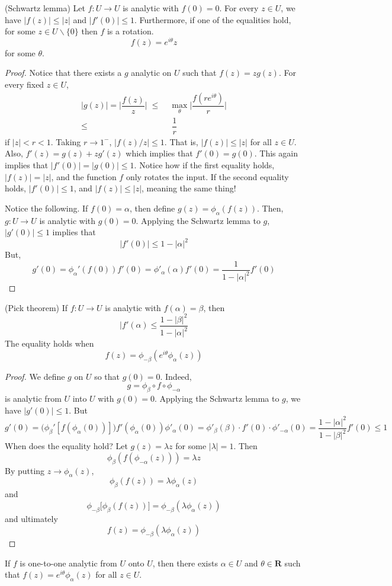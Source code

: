 \vspace{2ex}
\begin{thm}
(Schwartz lemma) Let $f:U\rightarrow U$ is analytic with $f(0)=0$. For every $z\in U$, we have $|f(z)|\leq |z|$ and $|f'(0)|\leq 1$. Furthermore, if one of the equalities hold, for some $z\in U \backslash \{0\}$ then $f$ is a rotation.
\[f(z)=e^{i\theta }z\]
for some $\theta $.
\end{thm}
\vspace{2ex}
\begin{proof}
Notice that there exists a $g$ analytic on $U$ such that $f(z)=zg(z)$. For every fixed $z\in U$,
\[\begin{align*}
|g(z)|=\Big|\dfrac{f(z)}{z}\Big|\;\leq\; &\max_{\theta }\Big|\dfrac{f(re^{i\theta })}{r}\Big|\\
\leq \;&\; \dfrac{1}{r}
\end{align*}\]
if $|z|<r<1$. Taking $r\rightarrow 1^{-}$, $|f(z)/z|\leq 1$. That is, $|f(z)|\leq |z|$ for all $z\in U$. Also, $f'(z)=g(z)+zg'(z)$ which implies that $f'(0)=g(0)$. This again implies that $|f'(0)|=|g(0)|\leq 1$. Notice how if the first equality holds, $|f(z)|=|z|$, and the function $f$ only rotates the input. If the second equality holds, $|f'(0)|\leq 1$, and $|f(z)|\leq |z|$, meaning the same thing!

\bigskip

Notice the following. If $f(0)=\alpha $, then define $g(z)=\phi _{\alpha }(f(z))$. Then, $g:U\rightarrow U$ is analytic with $g(0)=0$. Applying the Schwartz lemma to $g$, $|g'(0)|\leq 1$ implies that
\[|f'(0)|\leq 1-|\alpha |^2\]
But, 
\[g'(0)=\phi _{\alpha }'(f(0))f'(0)=\phi '_{\alpha }(\alpha )f'(0)=\dfrac{1}{1-|\alpha |^2}f'(0)\]

\end{proof}
\vspace{2ex}
\begin{thm}
(Pick theorem) If $f:U\rightarrow U$ is analytic with $f(\alpha )=\beta $, then
\[|f'(\alpha )\leq \dfrac{1-|\beta |^2}{1-|\alpha |^2}\]
The equality holds when 
\[f(z)=\phi _{-\beta }(e^{i\theta }\phi _{\alpha }(z))\]
\end{thm}
\vspace{2ex}
\begin{proof}
We define $g$ on $U$ so that $g(0)=0$. Indeed,
\[g=\phi _{\beta }\circ f\circ \phi _{-\alpha }\]
is analytic from $U$ into $U$ with $g(0)=0$. Applying the Schwartz lemma to $g$, we have $|g'(0)|\leq 1$. But 
\[g'(0)=\Big(\phi _{\beta }'[f(\phi _{\alpha }(0))]\Big)f'(\phi _{\alpha }(0))\phi '_{\alpha }(0)=\phi '_{\beta }(\beta )\cdot f'(0 )\cdot \phi '_{-\alpha }(0)=\dfrac{1-|\alpha |^2}{1-|\beta |^2}f'(0)\leq 1\]
When does the equality hold? Let $g(z)=\lambda z$ for some $|\lambda |=1$. Then
\[\phi _{\beta }(f(\phi _{-\alpha }(z)))=\lambda z\]
By putting $z\rightarrow \phi _{\alpha }(z)$, 
\[\phi _{\beta }(f(z))=\lambda \phi _{\alpha }(z)\]
and
\[\phi _{-\beta }\Big[\phi _{\beta }(f(z))\Big]=\phi _{-\beta }(\lambda \phi _{\alpha }(z))\]
and ultimately
\[f(z)=\phi _{-\beta }(\lambda \phi _{\alpha}(z))\]

\end{proof}
\vspace{2ex}
\begin{thm}
If $f$ is one-to-one analytic from $U$ onto $U$, then there exists $\alpha \in U$ and $\theta \in {\bm R}$ such that $f(z)=e^{i\theta }\phi _{\alpha }(z)$ for all $z\in U$.
\end{thm}
\vspace{2ex}

